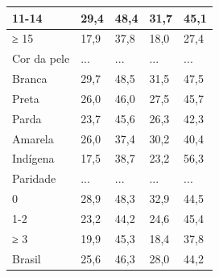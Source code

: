 \documentclass{article}
\begin{document}
\begin{table}
\begin{xtabular}{ l | l | l | l | l }
11-14
& 29,4
& 48,4
& 31,7
& 45,1
\\ \hline

≥ 15
& 17,9
& 37,8
& 18,0
& 27,4
\\ \hline

Cor da pele
& ...
& ...
& ...
& ...
\\ \hline

Branca
& 29,7
& 48,5
& 31,5
& 47,5
\\ \hline

Preta
& 26,0
& 46,0
& 27,5
& 45,7
\\ \hline

Parda
& 23,7
& 45,6
& 26,3
& 42,3
\\ \hline

Amarela
& 26,0
& 37,4
& 30,2
& 40,4
\\ \hline

Indígena
& 17,5
& 38,7
& 23,2
& 56,3
\\ \hline

Paridade
& ...
& ...
& ...
& ...
\\ \hline

0
& 28,9
& 48,3
& 32,9
& 44,5
\\ \hline

1-2
& 23,2
& 44,2
& 24,6
& 45,4
\\ \hline

≥ 3
& 19,9
& 45,3
& 18,4
& 37,8
\\ \hline

Brasil
& 25,6
& 46,3
& 28,0
& 44,2
\\ \hline

\end{xtabular}
\end{table}
\end{document}
